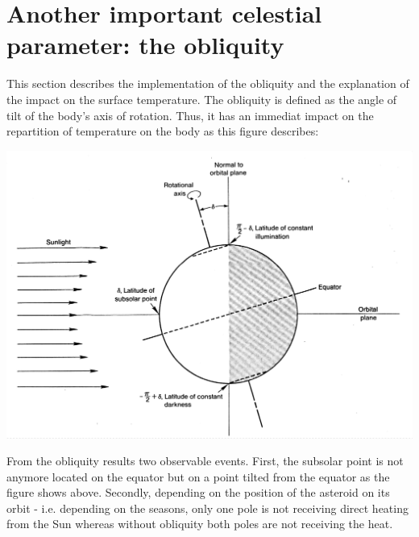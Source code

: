 \section{Another important celestial parameter: the obliquity}
\label{obliquity}

This section describes the implementation of the obliquity and the explanation of the impact on the surface temperature. The obliquity is defined as the angle of tilt of the body's axis of rotation. Thus, it has an immediat impact on the repartition of temperature on the body as this figure describes: 
\begin{center}
    \includegraphics[width=\linewidth]{rsc/obliquity.png}
\end{center}
From the obliquity results two observable events. First, the subsolar point is not anymore located on the equator but on a point tilted from the equator as the figure shows above. Secondly, depending on the position of the asteroid on its orbit - i.e. depending on the seasons, only one pole is not receiving direct heating from the Sun whereas without obliquity both poles are not receiving the heat.

